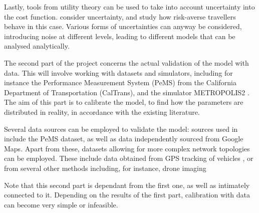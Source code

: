 \documentclass{article}
\begin{document}
Lastly, tools from utility theory can be used to take into account uncertainty into the cost function.
\textcite{de2013random, doi:10.1177/0361198118792336} consider uncertainty,
and study how risk-averse travellers behave in this case.
Various forms of uncertainties can anyway be considered,
introducing noise at different levels,
leading to different models that can be analysed analytically.

The second part of the project concerns the actual validation of the model with data.
This will involve working with datasets and simulators,
including for instance the Performance Measurement System (PeMS) from the California Department of Transportation (CalTrans),
and the simulator METROPOLIS2 \parencite{RePEc:ema:worpap:2024-03}.
The aim of this part is to calibrate the model,
to find how the parameters are distributed in reality,
in accordance with the existing literature.

Several data sources can be employed to validate the model:
sources used in \textcite{https://doi.org/10.1111/iere.12692} include the PeMS dataset,
as well as data independently sourced from Google Maps.
Apart from these, datasets allowing for more complex network topologies can be employed.
These include data obtained from GPS tracking of vehicles \parencite{mazare2012trade},
or from several other methods including, for instance, drone imaging \parencite{fonod2025songdo}

Note that this second part is dependant from the first one,
as well as intimately connected to it.
Depending on the results of the first part,
calibration with data can become very simple or infeasible.

\newpage
\printbibliography
\end{document}
